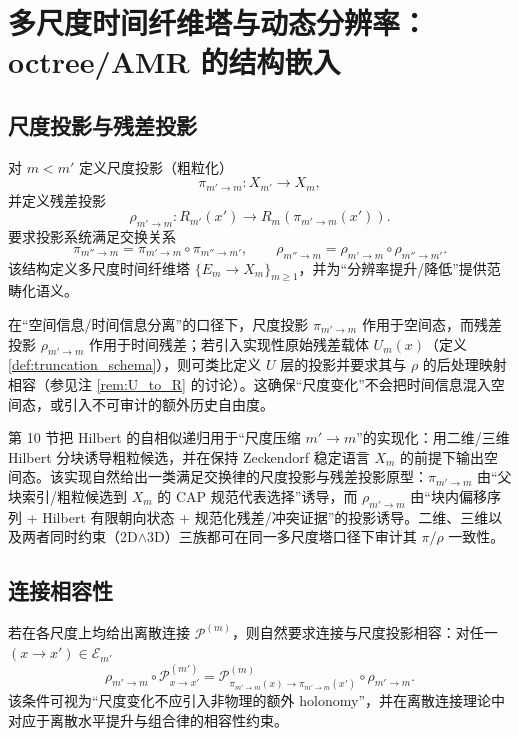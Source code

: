 \section{多尺度时间纤维塔与动态分辨率：octree/AMR 的结构嵌入}

\subsection{尺度投影与残差投影}

对 $m<m'$ 定义尺度投影（粗粒化）
$$
\pi_{m'\to m}:X_{m'}\to X_m,
$$
并定义残差投影
$$
\rho_{m'\to m}:R_{m'}(x')\to R_m(\pi_{m'\to m}(x')).
$$
要求投影系统满足交换关系
$$
\pi_{m''\to m}=\pi_{m'\to m}\circ\pi_{m''\to m'},\qquad
\rho_{m''\to m}=\rho_{m'\to m}\circ\rho_{m''\to m'}.
$$
该结构定义多尺度时间纤维塔 $\{E_m\to X_m\}_{m\ge 1}$，并为“分辨率提升/降低”提供范畴化语义。

\AuditTag 在“空间信息/时间信息分离”的口径下，尺度投影 $\pi_{m'\to m}$ 作用于空间态，而残差投影 $\rho_{m'\to m}$ 作用于时间残差；若引入实现性原始残差载体 $U_m(x)$（定义 \ref{def:truncation_schema}），则可类比定义 $U$ 层的投影并要求其与 $\rho$ 的后处理映射相容（参见注 \ref{rem:U_to_R} 的讨论）。这确保“尺度变化”不会把时间信息混入空间态，或引入不可审计的额外历史自由度。

\begin{remark}\label{rem:hilbert_pi_rho_prototype}
\AuditTag
第 10 节把 Hilbert 的自相似递归用于“尺度压缩 $m'\to m$”的实现化：用二维/三维 Hilbert 分块诱导粗粒候选，并在保持 Zeckendorf 稳定语言 $X_m$ 的前提下输出空间态。该实现自然给出一类满足交换律的尺度投影与残差投影原型：$\pi_{m'\to m}$ 由“父块索引/粗粒候选到 $X_m$ 的 CAP 规范代表选择”诱导，而 $\rho_{m'\to m}$ 由“块内偏移序列 + Hilbert 有限朝向状态 + 规范化残差/冲突证据”的投影诱导。二维、三维以及两者同时约束（2D$\wedge$3D）三族都可在同一多尺度塔口径下审计其 $\pi/\rho$ 一致性。
\end{remark}

\subsection{连接相容性}

若在各尺度上均给出离散连接 $\mathcal P^{(m)}$，则自然要求连接与尺度投影相容：对任一 $(x\to x')\in\mathcal E_{m'}$
$$
\rho_{m'\to m}\circ \mathcal P^{(m')}_{x\to x'}
=\mathcal P^{(m)}_{\pi_{m'\to m}(x)\to \pi_{m'\to m}(x')}\circ \rho_{m'\to m}.
$$
该条件可视为“尺度变化不应引入非物理的额外 holonomy”，并在离散连接理论中对应于离散水平提升与组合律的相容性约束。


